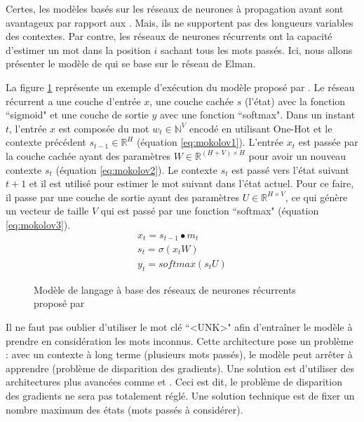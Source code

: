 \documentclass{KodeBook}
\begin{document}
Certes, les modèles basés sur les réseaux de neurones à propagation avant sont avantageux par rapport aux .
Mais, ils ne supportent pas des longueurs variables des contextes.
Par contre, les réseaux de neurones récurrents ont la capacité d'estimer un mot dans la position $i$ sachant tous les mots passés.
Ici, nous allons présenter le modèle de \citet{2010-mokolov-al} qui se base sur le réseau de Elman.

La figure \ref{fig:mokolov} représente un exemple d'exécution du modèle proposé par \citet{2010-mokolov-al}.
Le réseau récurrent a une couche d'entrée $x$, une couche cachée $s$ (l'état) avec la fonction ``sigmoid" et une couche de sortie $y$ avec une fonction ``softmax".
Dans un instant $t$, l'entrée $x$ est composée du mot $w_t \in \mathbb{N}^{V}$ encodé en utilisant One-Hot et le contexte précédent $s_{t-1} \in \mathbb{R}^{H}$ (équation \ref{eq:mokolov1}). 
L'entrée $x_t$ est passée par la couche cachée ayant des paramètres $W \in \mathbb{R}^{(H+V)\times H}$ pour avoir un nouveau contexte $s_t$ (équation \ref{eq:mokolov2}). 
Le contexte $s_t$ est passé vers l'état suivant $t+1$ et il est utilisé pour estimer le mot suivant dans l'état actuel.
Pour ce faire, il passe par une couche de sortie ayant des paramètres $U \in \mathbb{R}^{H\times V}$, ce qui génère un vecteur de taille $V$ qui est passé par une fonction ``softmax" (équation \ref{eq:mokolov3}).
%
\begin{align}
	x_t = s_{t-1} \bullet m_t \label{eq:mokolov1}\\
	s_t = \sigma(x_t W) \label{eq:mokolov2}\\
	y_t = softmax(s_t U) \label{eq:mokolov3}
\end{align}

\begin{figure}[ht]
	\centering
	\caption[Modèle de langage à base des réseaux de neurones récurrents]{Modèle de langage à base des réseaux de neurones récurrents proposé par \citet{2010-mokolov-al}\label{fig:mokolov}}
\end{figure}

Il ne faut pas oublier d'utiliser le mot clé ``\textless UNK\textgreater" afin d'entraîner le modèle à prendre en considération les mots inconnus. 
Cette architecture pose un problème : avec un contexte à long terme (plusieurs mots passés), le modèle peut arrêter à apprendre (problème de disparition des gradients).
Une solution est d'utiliser des architectures plus avancées comme  et . 
Ceci est dit, le problème de disparition des gradients ne sera pas totalement réglé.
Une solution technique est de fixer un nombre maximum des états (mots passés à considérer).
\end{document}
